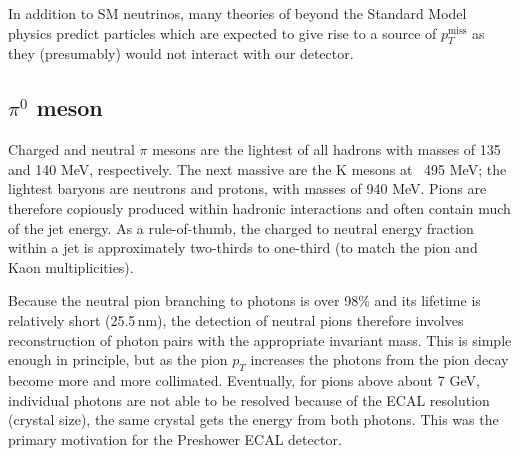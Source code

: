In addition to SM neutrinos, many theories of beyond the Standard Model physics predict particles which are expected to give rise to a source of $p_{T}^{\mathrm{miss}}$ as they (presumably) would not interact with our detector.

\subsection{$\pi^{0}$ meson}

Charged and neutral $\pi$ mesons are the lightest of all hadrons with masses of 135 and 140 MeV, respectively. The next massive are the K mesons at ~495 MeV; the lightest baryons are neutrons and protons, with masses of 940 MeV. Pions are therefore copiously produced within hadronic interactions and often contain much of the jet energy. As a rule-of-thumb, the charged to neutral energy fraction within a jet is approximately two-thirds to one-third (to match the pion and Kaon multiplicities).

Because the neutral pion branching to photons is over 98\% and its lifetime is relatively short (25.5$\,$nm), the detection of neutral pions therefore involves reconstruction of photon pairs with the appropriate invariant mass. This is simple enough in principle, but as the pion $p_{T}$ increases the photons from the pion decay become more and more collimated. Eventually, for pions above about 7 GeV, individual photons are not able to be resolved because of the ECAL resolution (crystal size), the same crystal gets the energy from both photons. This was the primary motivation for the Preshower ECAL detector.
